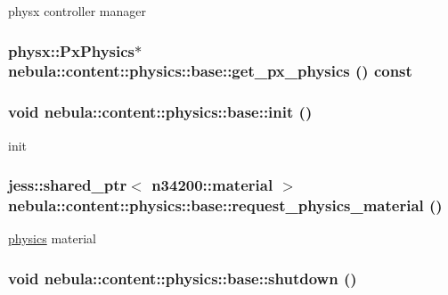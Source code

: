 physx controller manager \hypertarget{classnebula_1_1content_1_1physics_1_1base_abc804c1786fe0ce0044e33d4d5394738}{
\subsubsection[{get\_\-px\_\-physics}]{\setlength{\rightskip}{0pt plus 5cm}physx::PxPhysics$\ast$ nebula::content::physics::base::get\_\-px\_\-physics () const}}
\label{classnebula_1_1content_1_1physics_1_1base_abc804c1786fe0ce0044e33d4d5394738}
\hypertarget{classnebula_1_1content_1_1physics_1_1base_ac797ea2145a84c7929d32c303f0c41ef}{
\subsubsection[{init}]{\setlength{\rightskip}{0pt plus 5cm}void nebula::content::physics::base::init ()}}
\label{classnebula_1_1content_1_1physics_1_1base_ac797ea2145a84c7929d32c303f0c41ef}


init \hypertarget{classnebula_1_1content_1_1physics_1_1base_a6ee919f3584ddf99cc096e111540923d}{
\subsubsection[{request\_\-physics\_\-material}]{\setlength{\rightskip}{0pt plus 5cm}jess::shared\_\-ptr$<$ {\bf n34200::material} $>$ nebula::content::physics::base::request\_\-physics\_\-material ()}}
\label{classnebula_1_1content_1_1physics_1_1base_a6ee919f3584ddf99cc096e111540923d}


\hyperlink{namespacenebula_1_1content_1_1physics}{physics} material \hypertarget{classnebula_1_1content_1_1physics_1_1base_aeb6cf6fb210e1c83b1adef563470c737}{
\subsubsection[{shutdown}]{\setlength{\rightskip}{0pt plus 5cm}void nebula::content::physics::base::shutdown ()}}
\label{classnebula_1_1content_1_1physics_1_1base_aeb6cf6fb210e1c83b1adef563470c737}


